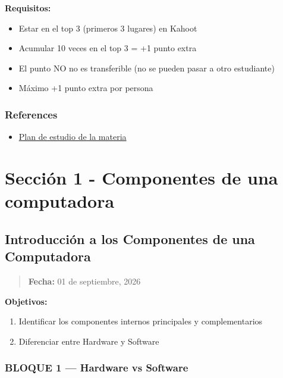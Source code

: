\documentclass[
  spanish,
  12pt,
  letterpaper,
  DIV=11,
  numbers=noendperiod]{scrreprt}
\providecommand{\tightlist}{%
  \setlength{\itemsep}{0pt}\setlength{\parskip}{0pt}}
\begin{document}
\textbf{Requisitos:}

\begin{itemize}
\tightlist
\item
  Estar en el top 3 (primeros 3 lugares) en Kahoot
\item
  Acumular 10 veces en el top 3 = +1 punto extra
\item
  El punto NO no es transferible (no se pueden pasar a otro estudiante)
\item
  Máximo +1 punto extra por persona
\end{itemize}

\section{References}\label{references-1}

\begin{itemize}
\tightlist
\item
  \href{https://docs.google.com/document/d/17rDksWqGWQqDFUMFqzgVF_BXnBDP3KMUrysgxIPGv9U/edit?usp=sharing}{Plan
  de estudio de la materia}
\end{itemize}

\part{\textbf{Sección 1} - Componentes de una computadora}

\chapter{Introducción a los Componentes de una
Computadora}\label{introducciuxf3n-a-los-componentes-de-una-computadora}

\begin{quote}
\textbf{Fecha:} 01 de septiembre, 2026
\end{quote}

\textbf{Objetivos:}

\begin{enumerate}
\def\labelenumi{\arabic{enumi}.}
\tightlist
\item
  Identificar los componentes internos principales y complementarios
\item
  Diferenciar entre Hardware y Software
\end{enumerate}

\section{\texorpdfstring{\textbf{BLOQUE 1 ---} Hardware vs
Software}{BLOQUE 1 --- Hardware vs Software}}\label{bloque-1-hardware-vs-software}
\end{document}
